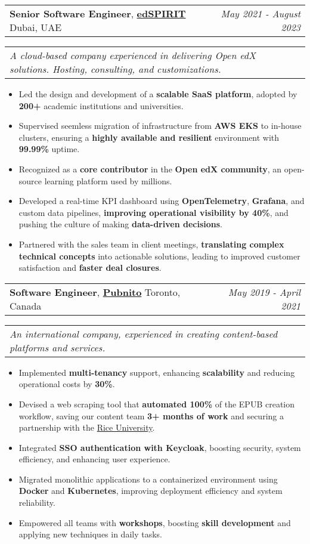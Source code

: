 \documentclass[letterpaper,11pt]{article}
\makeatletter
\newcommand{\resumeItemSimple}[1]{
  \item\small{
    {#1}
  }
}
\newcommand{\resumeSubheadingSimple}[5]{
  \vspace{-1pt}
    \begin{tabular*}{1\textwidth}[t]{l@{\extracolsep{\fill}}r}
      \textbf{#1}, \textbf{\href{#3}{#2}} \space \small#4 & \textit{\small #5} \\
    \end{tabular*}
}
\newcommand{\resumeSubSubheading}[2]{
    \begin{tabular*}{1\textwidth}{l@{\extracolsep{\fill}}r}
      \textit{\small#1} & \textit{\small #2} \\
    \end{tabular*}\vspace{-5pt}
}
\newcommand{\resumeItemListStart}{\begin{itemize}[leftmargin=0.5cm, itemsep=1pt, parsep=0pt]} %
\newcommand{\resumeItemListEnd}{\end{itemize}\vspace{-3pt}}
\makeatother
\begin{document}
      \resumeSubheadingSimple
        {Senior Software Engineer}{edSPIRIT}{https://www.linkedin.com/company/edspirit-tech/}{Dubai, UAE}{May 2021 - August 2023}
        \resumeSubSubheading{A cloud-based company experienced in delivering Open edX solutions. Hosting, consulting, and customizations.}{}
        \resumeItemListStart
          \resumeItemSimple{Led the design and development of a \textbf{scalable SaaS platform}, adopted by \textbf{200+} academic institutions and universities.}
          \resumeItemSimple{Supervised seemless migration of infrastructure from \textbf{AWS EKS} to in-house clusters, ensuring a \textbf{highly available and resilient} environment with \textbf{99.99\%} uptime.}
          \resumeItemSimple{Recognized as a \textbf{core contributor} in the \textbf{Open edX community}, an open-source learning platform used by millions.}
          \resumeItemSimple{Developed a real-time KPI dashboard using \textbf{OpenTelemetry}, \textbf{Grafana}, and custom data pipelines, \textbf{improving operational visibility by 40\%}, and pushing the culture of making \textbf{data-driven decisions}.}
          \resumeItemSimple{Partnered with the sales team in client meetings, \textbf{translating complex technical concepts} into actionable solutions, leading to improved customer satisfaction and \textbf{faster deal closures}.}
        \resumeItemListEnd

      \resumeSubheadingSimple
        {Software Engineer}{Pubnito}{https://www.linkedin.com/company/pubnito/}{Toronto, Canada}{May 2019 - April 2021}
        \resumeSubSubheading{An international company, experienced in creating content-based platforms and services.}{}
        \resumeItemListStart
          \resumeItemSimple{Implemented \textbf{multi-tenancy} support, enhancing \textbf{scalability} and reducing operational costs by \textbf{30\%}.}
          \resumeItemSimple{Devised a web scraping tool that \textbf{automated 100\%} of the EPUB creation workflow, saving our content team \textbf{3+ months of work} and securing a partnership with the \href{https://www.rice.edu/}{Rice University}.}
          \resumeItemSimple{Integrated \textbf{SSO authentication with Keycloak}, boosting security, system efficiency, and enhancing user experience.}
          \resumeItemSimple{Migrated monolithic applications to a containerized environment using \textbf{Docker} and \textbf{Kubernetes}, improving deployment efficiency and system reliability.}
          \resumeItemSimple{Empowered all teams with \textbf{workshops}, boosting \textbf{skill development} and applying new techniques in daily tasks.}
        \resumeItemListEnd
\end{document}
